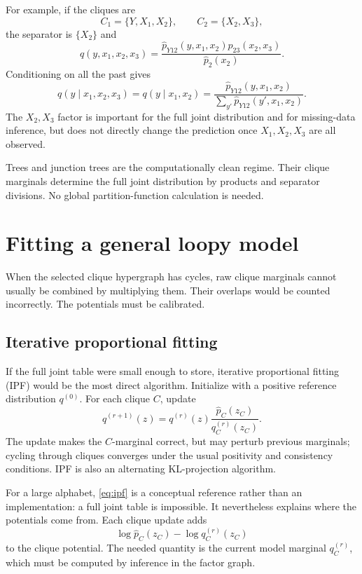 \documentclass[11pt]{article}
\newcommand{\1}{\mathbf 1}
\newcommand{\hatp}{\widehat p}
\begin{document}
For example, if the cliques are
\[
  C_1=\{Y,X_1,X_2\},\qquad
  C_2=\{X_2,X_3\},
\]
the separator is \(\{X_2\}\) and
\[
  q(y,x_1,x_2,x_3)
  =
  \frac{\hatp_{Y12}(y,x_1,x_2)\hatp_{23}(x_2,x_3)}
       {\hatp_2(x_2)}.
\]
Conditioning on all the past gives
\[
  q(y\mid x_1,x_2,x_3)
  =
  q(y\mid x_1,x_2)
  =
  \frac{\hatp_{Y12}(y,x_1,x_2)}
       {\sum_{y'}\hatp_{Y12}(y',x_1,x_2)}.
\]
The \(X_2,X_3\) factor is important for the full joint distribution and for
missing-data inference, but does not directly change the prediction once
\(X_1,X_2,X_3\) are all observed.

\begin{keyidea}
Trees and junction trees are the computationally clean regime.  Their clique
marginals determine the full joint distribution by products and separator
divisions.  No global partition-function calculation is needed.
\end{keyidea}

\section{Fitting a general loopy model}

When the selected clique hypergraph has cycles, raw clique marginals cannot
usually be combined by multiplying them.  Their overlaps would be counted
incorrectly.  The potentials must be calibrated.

\subsection{Iterative proportional fitting}

If the full joint table were small enough to store, iterative proportional
fitting (IPF) would be the most direct algorithm.  Initialize with a positive
reference distribution \(q^{(0)}\).  For each clique \(C\), update
\begin{equation}
  q^{(r+1)}(z)
  =
  q^{(r)}(z)
  \frac{\hatp_C(z_C)}{q^{(r)}_C(z_C)}.
  \label{eq:ipf}
\end{equation}
The update makes the \(C\)-marginal correct, but may perturb previous
marginals; cycling through cliques converges under the usual positivity and
consistency conditions.  IPF is also an alternating KL-projection algorithm.

For a large alphabet, \eqref{eq:ipf} is a conceptual reference rather than an
implementation: a full joint table is impossible.  It nevertheless explains
where the potentials come from.  Each clique update adds
\[
  \log\hatp_C(z_C)-\log q_C^{(r)}(z_C)
\]
to the clique potential.  The needed quantity is the current model marginal
\(q_C^{(r)}\), which must be computed by inference in the factor graph.
\end{document}
